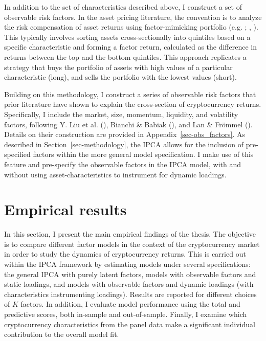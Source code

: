 \documentclass[
  12pt,
  a4paper,
  openany]{scrbook}
\begin{document}
In addition to the set of characteristics described above, I construct a
set of observable risk factors. In the asset pricing literature, the
convention is to analyze the risk compensation of asset returns using
factor-mimicking portfolio (e.g.
;
,
). This typically involves
sorting assets cross-sectionally into quintiles based on a specific
characteristic and forming a factor return, calculated as the difference
in returns between the top and the bottom quintiles. This approach
replicates a strategy that buys the portfolio of assets with high values
of a particular characteristic (long), and sells the portfolio with the
lowest values (short).

Building on this methodology, I construct a series of observable risk
factors that prior literature have shown to explain the cross-section of
cryptocurrency returns. Specifically, I include the market, size,
momentum, liquidity, and volatility factors, following Y. Liu et al.
(), Bianchi \& Babiak
(), and Lan \& Frömmel
(). Details on their construction
are provided in Appendix~\ref{sec-obs_factors}. As described in
Section~\ref{sec-methodology}, the IPCA allows for the inclusion of
pre-specified factors within the more general model specification. I
make use of this feature and pre-specify the observable factors in the
IPCA model, with and without using asset-characteristics to instrument
for dynamic loadings.


\chapter{Empirical results}\label{empirical-results}

In this section, I present the main empirical findings of the thesis.
The objective is to compare different factor models in the context of
the cryptocurrency market in order to study the dynamics of
cryptocurrency returns. This is carried out within the IPCA framework by
estimating models under several specifications: the general IPCA with
purely latent factors, models with observable factors and static
loadings, and models with observable factors and dynamic loadings (with
characteristics instrumenting loadings). Results are reported for
different choices of \(K\) factors. In addition, I evaluate model
performance using the total and predictive scores, both in-sample and
out-of-sample. Finally, I examine which cryptocurrency characteristics
from the panel data make a significant individual contribution to the
overall model fit.
\end{document}
